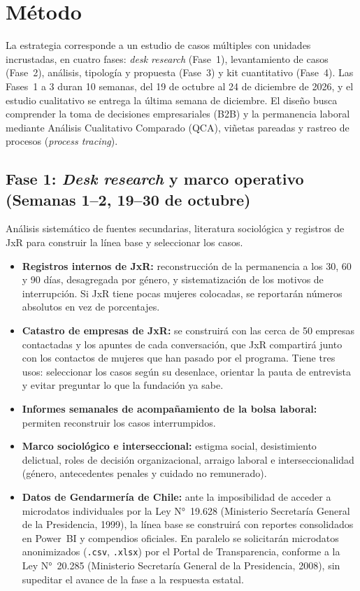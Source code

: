 \section{Método}

La estrategia corresponde a un estudio de casos múltiples con unidades incrustadas, en cuatro fases: \textit{desk research} (Fase~1), levantamiento de casos (Fase~2), análisis, tipología y propuesta (Fase~3) y kit cuantitativo (Fase~4). Las Fases~1 a 3 duran 10 semanas, del 19 de octubre al 24 de diciembre de 2026, y el estudio cualitativo se entrega la última semana de diciembre. El diseño busca comprender la toma de decisiones empresariales (B2B) y la permanencia laboral mediante Análisis Cualitativo Comparado (QCA), viñetas pareadas y rastreo de procesos (\textit{process tracing}).

\subsection{Fase 1: \textit{Desk research} y marco operativo (Semanas 1--2, 19--30 de octubre)}

Análisis sistemático de fuentes secundarias, literatura sociológica y registros de JxR para construir la línea base y seleccionar los casos.

\begin{itemize}
    \item \textbf{Registros internos de JxR:} reconstrucción de la permanencia a los 30, 60 y 90 días, desagregada por género, y sistematización de los motivos de interrupción. Si JxR tiene pocas mujeres colocadas, se reportarán números absolutos en vez de porcentajes.
    \item \textbf{Catastro de empresas de JxR:} se construirá con las cerca de 50 empresas contactadas y los apuntes de cada conversación, que JxR compartirá junto con los contactos de mujeres que han pasado por el programa. Tiene tres usos: seleccionar los casos según su desenlace, orientar la pauta de entrevista y evitar preguntar lo que la fundación ya sabe.
    \item \textbf{Informes semanales de acompañamiento de la bolsa laboral:} permiten reconstruir los casos interrumpidos.
    \item \textbf{Marco sociológico e interseccional:} estigma social, desistimiento delictual, roles de decisión organizacional, arraigo laboral e interseccionalidad (género, antecedentes penales y cuidado no remunerado).
    \item \textbf{Datos de Gendarmería de Chile:} ante la imposibilidad de acceder a microdatos individuales por la Ley N°~19.628 (Ministerio Secretaría General de la Presidencia, 1999), la línea base se construirá con reportes consolidados en Power~BI y compendios oficiales. En paralelo se solicitarán microdatos anonimizados (\texttt{.csv}, \texttt{.xlsx}) por el Portal de Transparencia, conforme a la Ley N°~20.285 (Ministerio Secretaría General de la Presidencia, 2008), sin supeditar el avance de la fase a la respuesta estatal.
\end{itemize}


